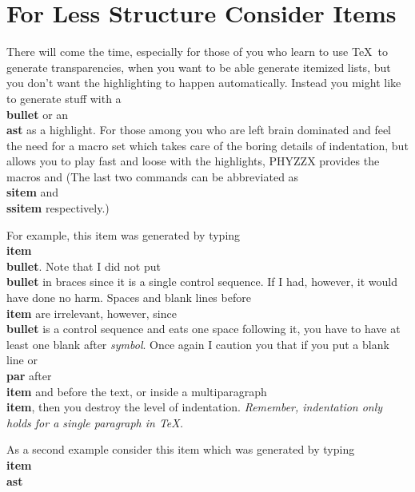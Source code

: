 \section{For Less Structure Consider Items}
 
There will come the time, especially for those of you who learn
to use \TeX\ to generate transparencies, when you want to be able
generate itemized lists, but you don't want the highlighting
to happen automatically.
Instead you might like to generate stuff with a {\bf \\bullet}
or an {\bf \\ast} as a highlight.
For those among you who are left brain dominated and
feel the need for a macro set which
takes care of the boring details of indentation, but allows
you to play fast and loose with the highlights,
PHYZZX provides the macros
and
(The last two commands can be abbreviated as {\bf \\sitem} and
{\bf \\ssitem} respectively.)
 
\item\bullet
For example, this item was generated by typing {\bf \\item\\bullet}.
Note that I did not put {\bf \\bullet} in braces since it
is a single control sequence. If I had, however, it would have
done no harm.
Spaces and blank lines before {\bf \\item} are irrelevant,
however, since {\bf \\bullet} is a control sequence and eats
one space following it, you have to have at least one blank
after {\it symbol}.
Once again I caution you that if you put a blank line or {\bf \\par}
after {\bf \\item} and before the text, or inside a multiparagraph
{\bf \\item}, then you destroy the level of indentation.
{\it Remember, indentation only holds for a single paragraph in \TeX .}
 
\item\ast
As a second example consider this item which was generated by
typing {\bf \\item\\ast}
 
